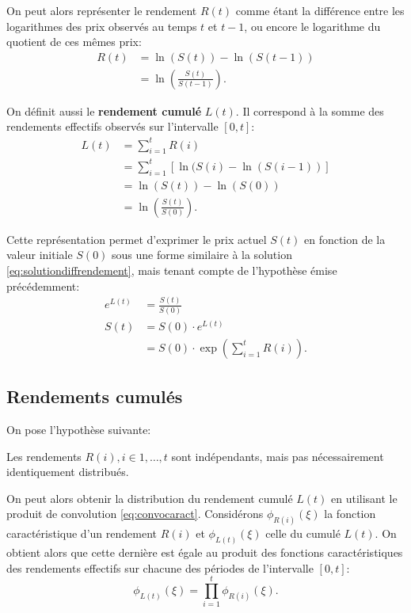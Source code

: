 On peut alors représenter le rendement $R(t)$ comme étant la
différence entre les logarithmes des prix observés au temps $t$ et
$t-1$, ou encore le logarithme du quotient de ces mêmes prix:
\begin{align}
  R(t) &= \ln{(S(t))} - \ln{(S(t-1))} \nonumber\\
  &=
  \ln{\left(\frac{S(t)}{S(t-1)}\right)}. \label{eq:rendementlogprix}
\end{align}

On définit aussi le \textbf{rendement cumulé} $L(t)$. Il correspond à
la somme des rendements effectifs observés sur l'intervalle
$\left[0,t\right]$:
\begin{align}
  L(t) &= \sum_{i=1}^{t} R(i) \nonumber\\
  &= \sum_{i=1}^{t} \left[\ln{(S(i)} - \ln{(S(i-1))}\right] \nonumber\\
  &= \ln{(S(t))} - \ln{(S(0))} \nonumber\\
  &= \ln{\left(\frac{S(t)}{S(0)}\right)}. \label{eq:rendementcumL}
\end{align}

Cette représentation permet d'exprimer le prix actuel $S(t)$ en
fonction de la valeur initiale $S(0)$ sous une forme similaire à la
solution \eqref{eq:solutiondiffrendement}, mais tenant compte de
l'hypothèse émise précédemment:
\begin{align}
  e^{L(t)} &= \frac{S(t)}{S(0)} \nonumber\\
  S(t) &= S(0) \cdot e^{L(t)} \nonumber\\
  &= S(0) \cdot \exp\left(\sum_{i=1}^{t} R(i)\right).
\end{align}

\subsection{Rendements cumulés}
\label{sec:rendementscum}

On pose l'hypothèse suivante:
\begin{hypothese}
  Les rendements $R(i), i \in 1, \ldots, t$ sont indépendants, mais
  pas nécessairement identiquement distribués.
\end{hypothese}

On peut alors obtenir la distribution du rendement cumulé $L(t)$ en
utilisant le produit de convolution \eqref{eq:convocaract}.
Considérons $\phi_{R(i)}(\xi)$ la fonction caractéristique d'un
rendement $R(i)$ et $\phi_{L(t)}(\xi)$ celle du cumulé $L(t)$. On
obtient alors que cette dernière est égale au produit des fonctions
caractéristiques des rendements effectifs sur chacune des périodes de
l'intervalle $\left[0,t\right]$:
\begin{equation}
  \label{eq:convolutionLR}
  \phi_{L(t)}(\xi) = \prod_{i=1}^t  \phi_{R(i)}(\xi).
\end{equation}

